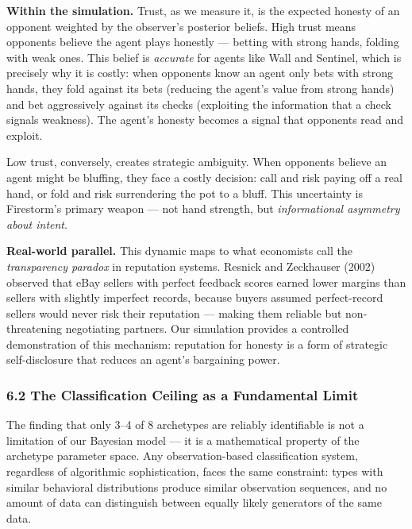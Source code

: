 \documentclass[
]{article}
\begin{document}
\textbf{Within the simulation.} Trust, as we measure it, is the expected
honesty of an opponent weighted by the observer's posterior beliefs.
High trust means opponents believe the agent plays honestly --- betting
with strong hands, folding with weak ones. This belief is
\emph{accurate} for agents like Wall and Sentinel, which is precisely
why it is costly: when opponents know an agent only bets with strong
hands, they fold against its bets (reducing the agent's value from
strong hands) and bet aggressively against its checks (exploiting the
information that a check signals weakness). The agent's honesty becomes
a signal that opponents read and exploit.

Low trust, conversely, creates strategic ambiguity. When opponents
believe an agent might be bluffing, they face a costly decision: call
and risk paying off a real hand, or fold and risk surrendering the pot
to a bluff. This uncertainty is Firestorm's primary weapon --- not hand
strength, but \emph{informational asymmetry about intent}.

\textbf{Real-world parallel.} This dynamic maps to what economists call
the \emph{transparency paradox} in reputation systems. Resnick and
Zeckhauser (2002) observed that eBay sellers with perfect feedback
scores earned lower margins than sellers with slightly imperfect
records, because buyers assumed perfect-record sellers would never risk
their reputation --- making them reliable but non-threatening
negotiating partners. Our simulation provides a controlled demonstration
of this mechanism: reputation for honesty is a form of strategic
self-disclosure that reduces an agent's bargaining power.

\hypertarget{the-classification-ceiling-as-a-fundamental-limit}{%
\subsubsection{6.2 The Classification Ceiling as a Fundamental
Limit}\label{the-classification-ceiling-as-a-fundamental-limit}}

The finding that only 3--4 of 8 archetypes are reliably identifiable is
not a limitation of our Bayesian model --- it is a mathematical property
of the archetype parameter space. Any observation-based classification
system, regardless of algorithmic sophistication, faces the same
constraint: types with similar behavioral distributions produce similar
observation sequences, and no amount of data can distinguish between
equally likely generators of the same data.
\end{document}
